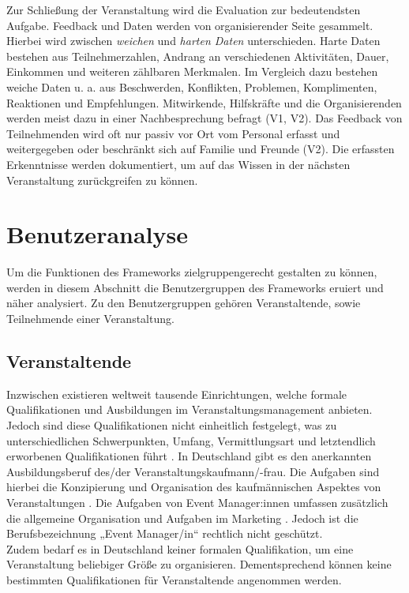 Zur Schließung der Veranstaltung wird die Evaluation zur bedeutendsten Aufgabe.
Feedback und Daten werden von organisierender Seite gesammelt. Hierbei wird
zwischen \textit{weichen} und \textit{harten Daten} unterschieden. Harte Daten
bestehen aus Teilnehmerzahlen, Andrang an verschiedenen Aktivitäten, Dauer,
Einkommen und weiteren zählbaren Merkmalen. Im Vergleich dazu bestehen weiche
Daten u. a. aus Beschwerden, Konflikten, Problemen, Komplimenten, Reaktionen und
Empfehlungen. Mitwirkende, Hilfskräfte und die Organisierenden werden meist dazu
in einer Nachbesprechung befragt (V1, V2). Das Feedback von Teilnehmenden wird
oft nur passiv vor Ort vom Personal erfasst und weitergegeben oder beschränkt
sich auf Familie und Freunde (V2). Die erfassten Erkenntnisse werden
dokumentiert, um auf das Wissen in der nächsten Veranstaltung zurückgreifen zu
können.

\newpage

\section{Benutzeranalyse} \label{sec:analysis-user}

Um die Funktionen des Frameworks zielgruppengerecht gestalten zu können, werden
in diesem Abschnitt die Benutzergruppen des Frameworks eruiert und näher
analysiert. Zu den Benutzergruppen gehören Veranstaltende, sowie Teilnehmende
einer Veranstaltung.

\subsection{Veranstaltende} \label{ssec:analysis-user-v}

Inzwischen existieren weltweit tausende Einrichtungen, welche formale
Qualifikationen und Ausbildungen im Veranstaltungsmanagement anbieten. Jedoch
sind diese Qualifikationen nicht einheitlich festgelegt, was zu
unterschiedlichen Schwerpunkten, Umfang, Vermittlungsart und letztendlich
erworbenen Qualifikationen führt \cite{Bladen2012}. In Deutschland gibt es den
anerkannten Ausbildungsberuf des/der Veranstaltungs\-kaufmann/-frau. Die
Aufgaben sind hierbei die Konzipierung und Organisation des kaufmännischen
Aspektes von Veranstaltungen \cite{Kultusministerkonferenz2001}. Die Aufgaben
von Event Manager:innen umfassen zusätzlich die allgemeine Organisation und
Aufgaben im Marketing \cite{BundesagenturfurArbeit2021}. Jedoch ist die
Berufsbezeichnung „Event Manager/in“ rechtlich nicht geschützt. \\
Zudem bedarf es in Deutschland keiner formalen Qualifikation, um eine
Veranstaltung beliebiger Größe zu organisieren. Dementsprechend können keine
bestimmten Qualifikationen für Veranstaltende angenommen werden.

